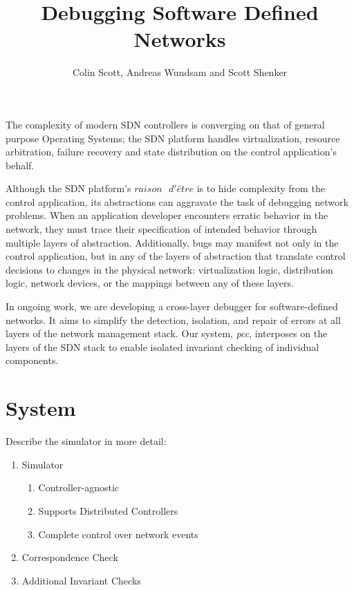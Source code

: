 \documentclass{sig-alternate-10pt}
\title{Debugging Software Defined Networks\vspace{-25pt}}
\author{Colin Scott, Andreas Wundsam and Scott Shenker}\vspace{-15pt}
\date{}
\newcommand{\projectname}[1]{{\it pcc}}
\begin{document}
    \maketitle
    \thispagestyle{empty}
%
%
%
%  

The complexity of modern SDN controllers is converging on that of general
purpose Operating Systems; the SDN platform handles virtualization,
resource arbitration, failure recovery and state distribution on the control
application's behalf.

Although the SDN platform's  $raison\text{ }d'\hat{e}tre$ is to 
hide complexity from the control application, its abstractions can 
aggravate the task of debugging network problems. When an application developer
encounters erratic behavior in the network, they must trace their
specification of intended behavior through
multiple layers of abstraction. Additionally, bugs may
manifest not only in the control application, but in any of the layers of
abstraction that translate control decisions to changes in the physical network:
virtualization logic, distribution logic, network devices, or the mappings
between any of these layers.

In ongoing work, we are developing a cross-layer debugger for software-defined
networks. It aims to simplify the detection, isolation, and repair of errors at
all layers of the network management stack. Our system, \projectname{},
interposes on the layers of the SDN stack to enable isolated invariant checking
of individual components.

\section{System}
Describe the simulator in more detail:
\begin{enumerate}
\item Simulator
\begin{enumerate}
\item Controller-agnostic
\item Supports Distributed Controllers
\item Complete control over network events
\end{enumerate}
\item Correspondence Check
\item Additional Invariant Checks
\end{enumerate}
\end{document}
